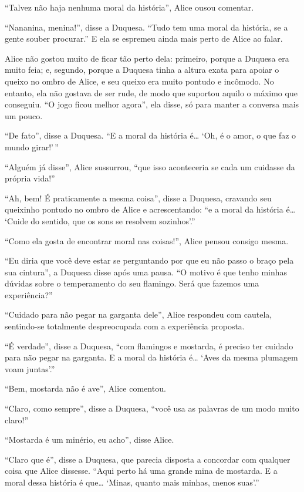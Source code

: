 ``Talvez não haja nenhuma moral da história'', Alice ousou comentar.

``Nananina, menina!'', disse a Duquesa. ``Tudo tem uma moral da
história, se a gente souber procurar.'' E ela se espremeu ainda mais
perto de Alice ao falar.

Alice não gostou muito de ficar tão perto dela: primeiro, porque a
Duquesa era muito feia; e, segundo, porque a Duquesa tinha a altura
exata para apoiar o queixo no ombro de Alice, e seu queixo era muito
pontudo e incômodo. No entanto, ela não gostava de ser rude, de modo que
suportou aquilo o máximo que conseguiu. ``O jogo ficou melhor agora'',
ela disse, só para manter a conversa mais um pouco.

``De fato'', disse a Duquesa. ``E a moral da história é\ldots{} `Oh, é o
amor, o que faz o mundo girar!'\,''

``Alguém já disse'', Alice sussurrou, ``que isso aconteceria se cada um
cuidasse da própria vida!''

``Ah, bem! É praticamente a mesma coisa'', disse a Duquesa, cravando seu
queixinho pontudo no ombro de Alice e acrescentando: ``e a moral da
história é\ldots{} `Cuide do sentido, que os sons se resolvem sozinhos'.''

``Como ela gosta de encontrar moral nas coisas!'', Alice pensou consigo
mesma.

``Eu diria que você deve estar se perguntando por que eu não passo o
braço pela sua cintura'', a Duquesa disse após uma pausa. ``O motivo é
que tenho minhas dúvidas sobre o temperamento do seu flamingo. Será que
fazemos uma experiência?''

``Cuidado para não pegar na garganta dele'', Alice respondeu com
cautela, sentindo-se totalmente despreocupada com a experiência
proposta.

``É verdade'', disse a Duquesa, ``com flamingos e mostarda, é preciso
ter cuidado para não pegar na garganta. E a moral da história é\ldots{} `Aves
da mesma plumagem voam juntas'.''

``Bem, mostarda não é ave'', Alice comentou.

``Claro, como sempre'', disse a Duquesa, ``você usa as palavras de um
modo muito claro!''

``Mostarda é um minério, eu acho'', disse Alice.

``Claro que é'', disse a Duquesa, que parecia disposta a concordar com
qualquer coisa que Alice dissesse. ``Aqui perto há uma grande mina de
mostarda. E a moral dessa história é que\ldots{} `Minas, quanto mais minhas,
menos suas'.''

